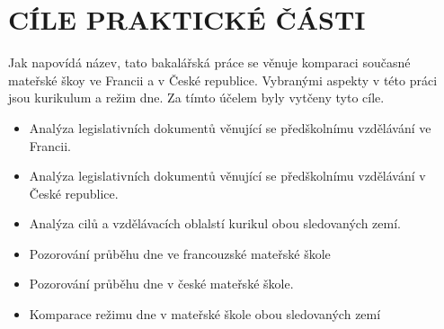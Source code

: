 \chapter{CÍLE PRAKTICKÉ ČÁSTI}
Jak napovídá název, tato bakalářská práce se věnuje komparaci současné mateřské škoy ve Francii a v České republice. Vybranými aspekty v této práci jsou kurikulum a režim dne. Za tímto účelem byly vytčeny tyto cíle.

\begin{itemize}
\item [] Analýza legislativních dokumentů věnující se předškolnímu vzdělávání ve Francii.
\item [] Analýza legislativních dokumentů věnující se předškolnímu vzdělávání v České republice.
\item [] Analýza cilů a vzdělávacích oblalstí kurikul obou sledovaných zemí.
\item [] Pozorování průběhu dne ve francouzské mateřské škole
\item [] Pozorování průběhu dne v české mateřské škole. 
\item [] Komparace režimu dne v mateřské škole obou sledovaných zemí
\end{itemize}


